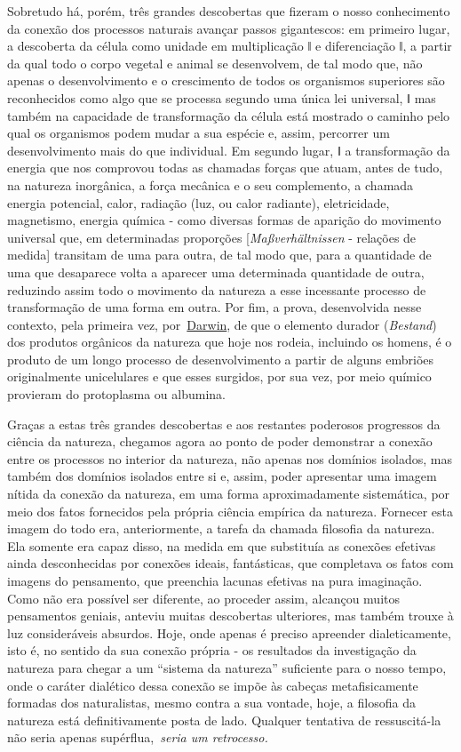 Sobretudo há, porém, três grandes descobertas que fizeram o nosso
conhecimento da conexão dos processos naturais avançar passos
gigantescos: em primeiro lugar, a descoberta da célula como unidade em
multiplicação ǁ e diferenciação ǁ, a partir da qual todo o corpo vegetal
e animal se desenvolvem, de tal modo que, não apenas o desenvolvimento e
o crescimento de todos os organismos superiores são reconhecidos como
algo que se processa segundo uma única lei universal, ǁ mas também na
capacidade de transformação da célula está mostrado o caminho pelo qual
os organismos podem mudar a sua espécie e, assim, percorrer um
desenvolvimento mais do que individual. Em segundo lugar, ǁ a
transformação da energia que nos comprovou todas as chamadas forças que
atuam, antes de tudo, na natureza inorgânica, a força mecânica e o seu
complemento, a chamada energia potencial, calor, radiação (luz, ou calor
radiante), eletricidade, magnetismo, energia química - como diversas
formas de aparição do movimento universal que, em determinadas
proporções {[}\emph{Maßverhältnissen} - relações de medida{]} transitam
de uma para outra, de tal modo que, para a quantidade de uma que
desaparece volta a aparecer uma determinada quantidade de outra,
reduzindo assim todo o movimento da natureza a esse incessante processo
de transformação de uma forma em outra. Por fim, a prova, desenvolvida
nesse contexto, pela primeira vez,
por~\href{https://www.marxists.org/portugues/dicionario/verbetes/d/darwin.htm}{Darwin},
de que o elemento durador (\emph{Bestand}) dos produtos orgânicos da
natureza que hoje nos rodeia, incluindo os homens, é o produto de um
longo processo de desenvolvimento a partir de alguns embriões
originalmente unicelulares e que esses surgidos, por sua vez, por meio
químico provieram do protoplasma ou albumina.

Graças a estas três grandes descobertas e aos restantes poderosos
progressos da ciência da natureza, chegamos agora ao ponto de poder
demonstrar a conexão entre os processos no interior da natureza, não
apenas nos domínios isolados, mas também dos domínios isolados entre si
e, assim, poder apresentar uma imagem nítida da conexão da natureza, em
uma forma aproximadamente sistemática, por meio dos fatos fornecidos
pela própria ciência empírica da natureza. Fornecer esta imagem do todo
era, anteriormente, a tarefa da chamada filosofia da natureza. Ela
somente era capaz disso, na medida em que substituía as conexões
efetivas ainda desconhecidas por conexões ideais, fantásticas, que
completava os fatos com imagens do pensamento, que preenchia lacunas
efetivas na pura imaginação. Como não era possível ser diferente, ao
proceder assim, alcançou muitos pensamentos geniais, anteviu muitas
descobertas ulteriores, mas também trouxe à luz consideráveis absurdos.
Hoje, onde apenas é preciso apreender dialeticamente, isto é, no sentido
da sua conexão própria - os resultados da investigação da natureza para
chegar a um ``sistema da natureza'' suficiente para o nosso tempo, onde
o caráter dialético dessa conexão se impõe às cabeças metafisicamente
formadas dos naturalistas, mesmo contra a sua vontade, hoje, a filosofia
da natureza está definitivamente posta de lado. Qualquer tentativa de
ressuscitá-la não seria apenas supérflua,~\emph{seria um retrocesso.}


